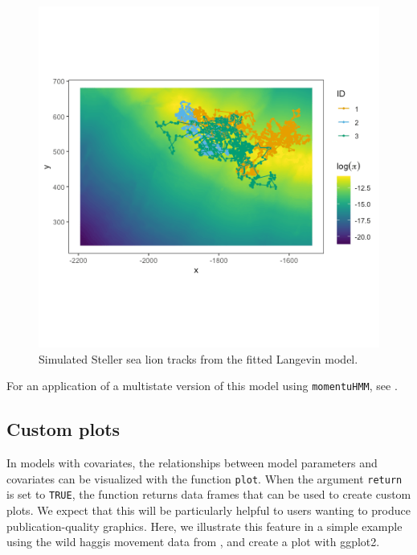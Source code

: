 \documentclass[12pt]{article}\usepackage[]{graphicx}\usepackage[]{xcolor}
\begin{document}
\begin{figure}
\center
\includegraphics[width=1\textwidth]{plot_simLangevin.png}
\caption{Simulated Steller sea lion tracks from the fitted Langevin model.}
\end{figure}
\noindent For an application of a multistate version of this model using \verb|momentuHMM|, see \citet{McClintockLander2024}.

\subsection{Custom plots}

In models with covariates, the relationships between model parameters and covariates can be visualized with the function \verb|plot|. When the argument \verb|return| is set to \verb|TRUE|, the function returns data frames that can be used to create custom plots. We expect that this will be particularly helpful to users wanting to produce publication-quality graphics. Here, we illustrate this feature in a simple example using the wild haggis movement data from \cite{MichelotEtAl2016}, and create a plot with ggplot2. 
\end{document}
